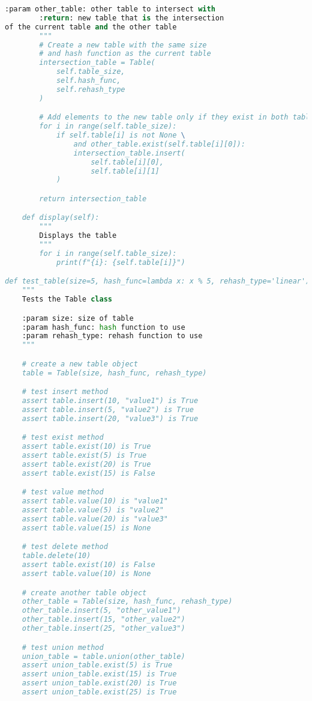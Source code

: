 \documentclass{article}
\begin{document}
\begin{lstlisting}[language=Python,label={lst:codesrc}]
        :param other_table: other table to intersect with
        :return: new table that is the intersection
of the current table and the other table
        """
        # Create a new table with the same size
        # and hash function as the current table
        intersection_table = Table(
            self.table_size,
            self.hash_func,
            self.rehash_type
        )

        # Add elements to the new table only if they exist in both tables
        for i in range(self.table_size):
            if self.table[i] is not None \
                and other_table.exist(self.table[i][0]):
                intersection_table.insert(
                    self.table[i][0],
                    self.table[i][1]
            )

        return intersection_table

    def display(self):
        """
        Displays the table
        """
        for i in range(self.table_size):
            print(f"{i}: {self.table[i]}")

def test_table(size=5, hash_func=lambda x: x % 5, rehash_type='linear'):
    """
    Tests the Table class

    :param size: size of table
    :param hash_func: hash function to use
    :param rehash_type: rehash function to use
    """

    # create a new table object
    table = Table(size, hash_func, rehash_type)

    # test insert method
    assert table.insert(10, "value1") is True
    assert table.insert(5, "value2") is True
    assert table.insert(20, "value3") is True

    # test exist method
    assert table.exist(10) is True
    assert table.exist(5) is True
    assert table.exist(20) is True
    assert table.exist(15) is False

    # test value method
    assert table.value(10) is "value1"
    assert table.value(5) is "value2"
    assert table.value(20) is "value3"
    assert table.value(15) is None

    # test delete method
    table.delete(10)
    assert table.exist(10) is False
    assert table.value(10) is None

    # create another table object
    other_table = Table(size, hash_func, rehash_type)
    other_table.insert(5, "other_value1")
    other_table.insert(15, "other_value2")
    other_table.insert(25, "other_value3")

    # test union method
    union_table = table.union(other_table)
    assert union_table.exist(5) is True
    assert union_table.exist(15) is True
    assert union_table.exist(20) is True
    assert union_table.exist(25) is True


\end{lstlisting}
\end{document}
